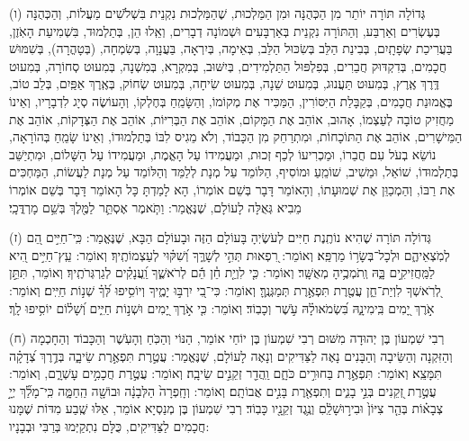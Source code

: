 \documentclass[twoside, openany, parskip=half, 11pt]{book}
\begin{document}
(ו)
 גְּדוֹלָה תּוֹרָה יוֹתֵר מִן הַכְּהֻנָּה וּמִן הַמַּלְכוּת, שֶׁהַמַּלְכוּת נִקְנֵית בִּשְׁלֹֹשִׁים מַעֲלוֹת, וְהַכְּהֻנָּה בְּעֶשְׂרִים וְאַרְבַּע, וְהַתּוֹרָה נִקְנֵית בְּאַרְבָּעִים וּשְׁמוֹנָה דְבָרִים, וְאֵֽלוּ הֵן, בְּתַלְמוּד, בִּשְׁמִיעַת הָאֹֽזֶן, בַּעֲרִיכַת שְׂפָתָֽיִם, בְּבִינַת הַלֵּב בְּשִׂכּוּל הַלֵּב, בְּאֵימָה, בְּיִרְאָה, בַּעֲנָוָה, בְּשִׂמְחָה, (בְּטָהֳרָה), בְּשִׁמּוּשׁ חֲכָמִים, בְּדִקְדּוּק חֲבֵרִים, בְּפִלְפּוּל הַתַּלְמִידִים, בְּיִשּׁוּב, בְּמִקְרָא, בְּמִשְׁנָה, בְּמִעוּט סְחוֹרָה, בְּמִעוּט דֶּֽרֶךְ אֶֽרֶץ, בְּמִעוּט תַּעֲנוּג, בְּמִעוּט שֵׁנָה, בְּמִעוּט שִׂיחָה, בְּמִעוּט שְׂחוֹק, בְּאֶֽרֶךְ אַפַּֽיִם, בְּלֵב טוֹב, בֶּאֱמוּנַת חֲכָמִים, בְּקַבָּלַת הַיִּסּוֹרִין, הַמַּכִּיר אֶת מְקוֹמוֹ, וְהַשָּׂמֵֽחַ בְּחֶלְקוֹ, וְהָעוֹשֶׂה סְיָג לִדְבָרָיו, וְאֵינוֹ מַחֲזִיק טוֹבָה לְעַצְמוֹ, אָהוּב, אוֹהֵב אֶת הַמָּקוֹם, אוֹהֵב אֶת הַבְּרִיּוֹת, אוֹהֵב אֶת הַצְּדָקוֹת, אוֹהֵב אֶת הַמֵּישָׁרִים, אוֹהֵב אֶת הַתּוֹכָחוֹת, וּמִתְרַחֵק מִן הַכָּבוֹד, וְלֹא מֵגִיס לִבּוֹ בְּתַלְמוּדוֹ, וְאֵינוֹ שָׂמֵֽחַ בְּהוֹרָאָה, נוֹשֵׂא בְעֹל עִם חֲבֵרוֹ, וּמַכְרִיעוֹ לְכַף זְכוּת, וּמַעֲמִידוֹ עַל הָאֱמֶת, וּמַעֲמִידוֹ עַל הַשָּׁלוֹם, וּמִתְיַשֵּׁב בְּתַלְמוּדוֹ, שׁוֹאֵל, וּמֵשִׁיב, שׁוֹמֵֽעַ וּמוֹסִיף, הַלּוֹמֵד עַל מְנָת לְלַמֵּד וְהַלּוֹמֵד עַל מְנָת לַעֲשׂוֹת, הַמַּחְכִּים אֶת רַבּוֹ, וְהַמְכַוֵּן אֶת שְׁמוּעָתוֹ, וְהָאוֹמֵר דָּבָר בְּשֵׁם אוֹמְרוֹ, הָא לָמַדְתָּ כָּל הָאוֹמֵר דָּבָר בְּשֵׁם אוֹמְרוֹ מֵבִיא גְּאֻלָּה לָעוֹלָם, שֶׁנֶּאֱמַר:  וַתֹּ֧אמֶר אֶסְתֵּ֛ר לַמֶּ֖לֶךְ בְּשֵׁ֥ם מָרְדֳּכָֽי׃

(ז)
 גְּדוֹלָה תּוֹרָה שֶׁהִיא נוֹתֶֽנֶת חַיִּים לְעֹשֶׂיֽהָ בָּעוֹלָם הַזֶּה וּבָעוֹלָם הַבָּא, שֶׁנֶּאֱמַר: כִּֽי־חַיִּ֣ים הֵ֭ם לְמֹֽצְאֵיהֶ֑ם וּלְכָל־בְּשָׂר֥וֹ מַרְפֵּֽא׃ וְאוֹמֵר: רִ֭פְאוּת תְּהִ֣י לְשָׁרֶּ֑ךָ וְ֝שִׁקּ֗וּי לְעַצְמוֹתֶֽיךָ׃ וְאוֹמֵר: עֵֽץ־חַיִּ֣ים הִ֭יא לַמַּֽחֲזִיקִ֣ים בָּ֑הּ וְֽתֹמְכֶ֥יהָ מְאֻשָּֽׁר׃ וְאוֹמֵר: כִּ֤י לִוְיַ֤ת חֵ֓ן הֵ֬ם לְרֹאשֶׁ֑ךָ וַֽ֝עֲנָקִ֗ים לְגַרְגְּרֹתֶֽיךָ׃ וְאוֹמֵר, תִּתֵּ֣ן לְ֭רֹֽאשְׁךָ לִוְיַת־חֵ֑ן עֲטֶ֖רֶת תִּפְאֶ֣רֶת תְּמַגְּנֶֽךָּ׃ וְאוֹמֵר: כִּי־בִ֭י יִרְבּ֣וּ יָמֶ֑יךָ וְיוֹסִ֥יפוּ לְּ֝ךָ֗ שְׁנ֣וֹת חַיִּֽים׃ וְאוֹמֵר: אֹ֣רֶךְ יָ֭מִים בִּֽימִינָ֑הּ בִּ֝שְׂמֹאולָ֗הּ עֹ֣שֶׁר וְכָבֽוֹד׃ וְאוֹמֵר: כִּ֤י אֹ֣רֶךְ יָ֭מִים וּשְׁנ֣וֹת חַיִּ֑ים וְ֝שָׁל֗וֹם יוֹסִ֥יפוּ לָֽךְ׃

(ח)
 רְבִי שִׁמְעוֹן בֶּן יְהוּדָה מִשּׁוּם רְבִי שִׁמְעוֹן בֶּן יוֹחַי אוֹמֵר, הַנּוֹי וְהַכֹּֽחַ וְהָעֹֽשֶׁר וְהַכָּבוֹד וְהַחָכְמָה וְהַזִּקְנָה וְהַשֵּׂיבָה וְהַבָּנִים נָאֶה לַצַּדִּיקִים וְנָאֶה לָעוֹלָם, שֶׁנֶּאֱמַר: עֲטֶ֣רֶת תִּפְאֶ֣רֶת שֵׂיבָ֑ה בְּדֶ֥רֶךְ צְ֝דָקָ֗ה תִּמָּצֵֽא׃ וְאוֹמֵר: תִּפְאֶ֣רֶת בַּחוּרִ֣ים כֹּחָ֑ם וַֽהֲדַ֖ר זְקֵנִ֣ים שֵׂיבָֽה׃ וְאוֹמֵר: עֲטֶ֣רֶת חֲכָמִ֣ים עָשְׁרָ֑ם, וְאוֹמֵר: עֲטֶ֣רֶת זְ֭קֵנִים בְּנֵ֣י בָנִ֑ים וְתִפְאֶ֖רֶת בָּנִ֣ים אֲבוֹתָֽם׃ וְאוֹמֵר: וְחָֽפְרָה֙ הַלְּבָנָ֔ה וּבוֹשָׁ֖ה הַֽחַמָּ֑ה כִּֽי־מָלַ֞ךְ יְיָ֣ צְבָא֗וֹת בְּהַ֤ר צִיּוֹן֙ וּבִיר֣וּשָׁלַֽ֔םִ וְנֶ֥גֶד זְקֵנָ֖יו כָּבֽוֹד׃ רְבִי שִׁמְעוֹן בֶּן מְנַסְיָא אוֹמֵר, אֵלּוּ שֶֽׁבַע מִדּוֹת שֶׁמָּנוּ חֲכָמִים לַצַּדִּיקִים, כֻּלָּם נִתְקַיְּמוּ בְּרַבִּי וּבְבָנָיו:
\end{document}
